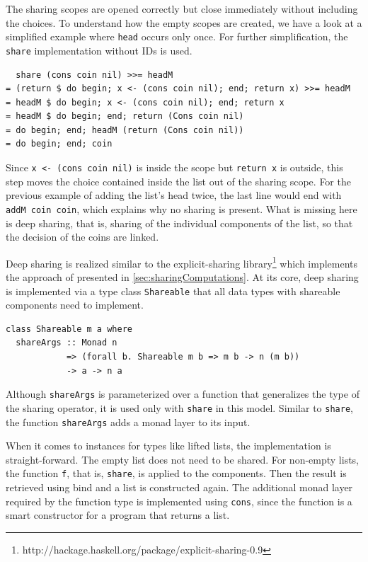 \documentclass[a4paper, 11pt, fleqn, twoside]{scrreprt}
\newcommand{\hinl}[1]{\texttt{#1}}
\begin{document}
The sharing scopes are opened correctly but close immediately without including the choices.
To understand how the empty scopes are created, we have a look at a simplified example where \hinl{head} occurs only once.
For further simplification, the \hinl{share} implementation without IDs is used.

\begin{verbatim}
  share (cons coin nil) >>= headM
= (return $ do begin; x <- (cons coin nil); end; return x) >>= headM
= headM $ do begin; x <- (cons coin nil); end; return x
= headM $ do begin; end; return (Cons coin nil)
= do begin; end; headM (return (Cons coin nil))
= do begin; end; coin
\end{verbatim}

Since \hinl{x <- (cons coin nil)} is inside the scope but \hinl{return x} is outside, this step moves the choice contained inside the list out of the sharing scope.
For the previous example of adding the list's head twice, the last line would end with \hinl{addM coin coin}, which explains why no sharing is present.
What is missing here is deep sharing, that is, sharing of the individual components of the list, so that the decision of the coins are linked.

Deep sharing is realized similar to the explicit-sharing library\footnote{http://hackage.haskell.org/package/explicit-sharing-0.9} which implements the approach of \citep{fischer2009purely} presented in \autoref{sec:sharingComputations}.
At its core, deep sharing is implemented via a type class \hinl{Shareable} that all data types with shareable components need to implement.

\begin{verbatim}
class Shareable m a where
  shareArgs :: Monad n 
            => (forall b. Shareable m b => m b -> n (m b))
            -> a -> n a
\end{verbatim}

Although \hinl{shareArgs} is parameterized over a function that generalizes the type of the sharing operator, it is used only with \hinl{share} in this model.
Similar to \hinl{share}, the function \hinl{shareArgs} adds a monad layer to its input.

When it comes to instances for types like lifted lists, the implementation is straight-forward.
The empty list does not need to be shared.
For non-empty lists, the function \hinl{f}, that is, \hinl{share}, is applied to the components.
Then the result is retrieved using bind and a list is constructed again.
The additional monad layer required by the function type is implemented using \hinl{cons}, since the function is a smart constructor for a program that returns a list.
\end{document}
